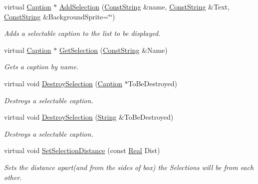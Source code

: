 \begin{DoxyCompactItemize}
virtual \hyperlink{classphys_1_1UI_1_1Caption}{Caption} $\ast$ \hyperlink{classphys_1_1UI_1_1ListBox_aa6069fc3690e09142033886d9d7b0b3a}{AddSelection} (\hyperlink{namespacephys_a5ce5049f8b4bf88d6413c47b504ebb31}{ConstString} \&name, \hyperlink{namespacephys_a5ce5049f8b4bf88d6413c47b504ebb31}{ConstString} \&Text, \hyperlink{namespacephys_a5ce5049f8b4bf88d6413c47b504ebb31}{ConstString} \&BackgroundSprite=\char`\"{}\char`\"{})
\begin{DoxyCompactList}\small\item\em Adds a selectable caption to the list to be displayed. \item\end{DoxyCompactList}\item 
virtual \hyperlink{classphys_1_1UI_1_1Caption}{Caption} $\ast$ \hyperlink{classphys_1_1UI_1_1ListBox_a1a5f9c44430387cc96744411bea9e978}{GetSelection} (\hyperlink{namespacephys_a5ce5049f8b4bf88d6413c47b504ebb31}{ConstString} \&Name)
\begin{DoxyCompactList}\small\item\em Gets a caption by name. \item\end{DoxyCompactList}\item 
virtual void \hyperlink{classphys_1_1UI_1_1ListBox_a295acf830ed17c78a59e5ba871a5a234}{DestroySelection} (\hyperlink{classphys_1_1UI_1_1Caption}{Caption} $\ast$ToBeDestroyed)
\begin{DoxyCompactList}\small\item\em Destroys a selectable caption. \item\end{DoxyCompactList}\item 
virtual void \hyperlink{classphys_1_1UI_1_1ListBox_a3aa3bfaee473b7590692e8707dada68d}{DestroySelection} (\hyperlink{namespacephys_aa03900411993de7fbfec4789bc1d392e}{String} \&ToBeDestroyed)
\begin{DoxyCompactList}\small\item\em Destroys a selectable caption. \item\end{DoxyCompactList}\item 
virtual void \hyperlink{classphys_1_1UI_1_1ListBox_a436882336e5630d97f569b10273e7f0d}{SetSelectionDistance} (const \hyperlink{namespacephys_af7eb897198d265b8e868f45240230d5f}{Real} Dist)
\begin{DoxyCompactList}\small\item\em Sets the distance apart(and from the sides of box) the Selections will be from each other. \item\end{DoxyCompactList}\item 

\end{DoxyCompactItemize}
